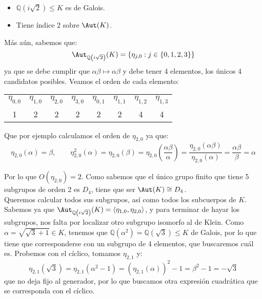 \begin{ejemplo}
    \begin{itemize}
        \item $\mathbb{Q}\left(i\sqrt{2}\right)\leq K$ es de Galois.
        \item Tiene índice 2 sobre $\Aut(K)$.
    \end{itemize}
    Más aún, sabemos que:
    \begin{equation*}
        \Aut_{\mathbb{Q}\left(i\sqrt{2}\right)}(K) = \{\eta_{j,0} : j \in \{0,1,2,3\}\}
    \end{equation*}
    ya que se debe cumplir que $\alpha\beta\longmapsto \alpha\beta$ y debe tener 4 elementos, los únicos 4 candidatos posibles. Veamos el orden de cada elemento:
    \begin{table}[H]
    \centering
    \begin{tabular}{cccccccc}
        $\eta_{0,0}$ &  $\eta_{1,0}$ & $\eta_{2,0}$ & $\eta_{3,0}$ & $\eta_{0,1}$ & $\eta_{1,1}$ & $\eta_{1,2}$ & $\eta_{1,3}$ \\
        1 & 2 & 2 & 2 & 2 & 2 & 4 & 4
    \end{tabular}
    \end{table}
    \noindent
    Que por ejemplo calculamos el orden de $\eta_{2,0}$ ya que:
    \begin{equation*}
        \eta_{2,0}(\alpha) = \beta, \qquad \eta_{2,0}^2(\alpha) = \eta_{2,0}(\beta) = \eta_{2,0}\left(\frac{\alpha\beta}{\alpha}\right) = \frac{\eta_{2,0}(\alpha\beta)}{\eta_{2,0}(\alpha)} = \frac{\alpha\beta}{\beta} = \alpha
    \end{equation*}

    Por lo que $O(\eta_{2,0}) = 2$. Como sabemos que el único grupo finito que tiene 5 subgrupos de orden 2 es $D_4$, tiene que ser $\Aut(K) \cong D_4$.\\

    \noindent
    Queremos calcular todos sus subgrupos, así como todos los subcuerpos de $K$.\\

    \noindent
    Sabemos ya que $\Aut_{\mathbb{Q}\left(i\sqrt{2}\right)}(K) = \langle \eta_{1,0}, \eta_{2,0} \rangle $, y para terminar de hayar los subgrupos, nos falta por localizar otro subgrupo isomorfo al de Klein. Como $\alpha = \sqrt{\sqrt{3}+1}\in K$, tenemos que $\mathbb{Q}(\alpha^2)=\mathbb{Q}(\sqrt{3})\leq K$ de Galois, por lo que tiene que corresponderse con un subgrupo de 4 elementos, que buscaremos cuál es. Probemos con el cíclico, tomamos $\eta_{2,1}$ y:
    \begin{equation*}
        \eta_{2,1}\left(\sqrt{3}\right) = \eta_{2,1}(\alpha^2 -1) = {(\eta_{2,1}(\alpha))}^{2} - 1 = \beta^2 -1 = -\sqrt{3}
    \end{equation*}
    que no deja fijo al generador, por lo que buscamos otra expresión cuadrática que se corresponda con el cíclico.\\


\end{ejemplo}
